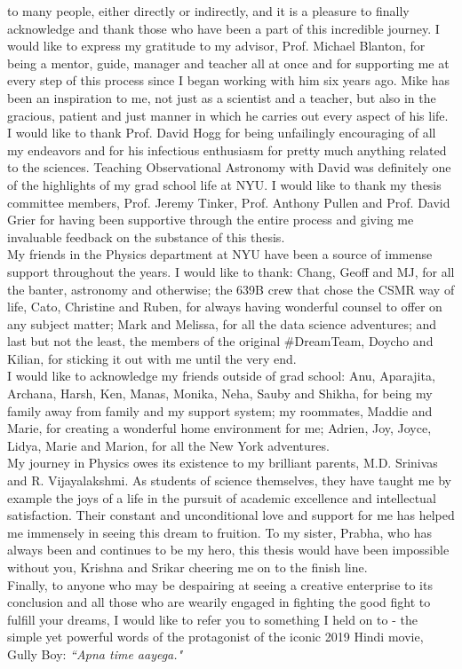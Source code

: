 
 to many people, either directly or indirectly, and it is a pleasure to finally acknowledge and thank those who have been a part of this incredible journey. I would like to express my gratitude to my advisor, Prof. Michael Blanton, for being a mentor, guide, manager and teacher all at once and for supporting me at every step of this process since I began working with him six years ago. Mike has been an inspiration to me, not just as a scientist and a teacher, but also in the gracious, patient and just manner in which he carries out every aspect of his life. I would like to thank Prof. David Hogg for being unfailingly encouraging of all my endeavors and for his infectious enthusiasm for pretty much anything related to the sciences. Teaching Observational Astronomy with David was definitely one of the highlights of my grad school life at NYU. I would like to thank my thesis committee members, Prof. Jeremy Tinker, Prof. Anthony Pullen and Prof. David Grier for having been supportive through the entire process and giving me invaluable feedback on the substance of this thesis.\\

My friends in the Physics department at NYU have been a source of immense support throughout the years. I would like to thank: Chang, Geoff and MJ, for all the banter, astronomy and otherwise; the 639B crew that chose the CSMR way of life, Cato, Christine and Ruben, for always having wonderful counsel to offer on any subject matter; Mark and Melissa, for all the data science adventures; and last but not the least, the members of the original \#DreamTeam, Doycho and Kilian, for sticking it out with me until the very end.\\

I would like to acknowledge my friends outside of grad school: Anu, Aparajita, Archana, Harsh, Ken, Manas, Monika, Neha, Sauby and Shikha, for being my family away from family and my support system; my roommates, Maddie and Marie, for creating a wonderful home environment for me; Adrien, Joy, Joyce, Lidya, Marie and Marion, for all the New York adventures.\\

My journey in Physics owes its existence to my brilliant parents, M.D. Srinivas and R. Vijayalakshmi. As students of science themselves, they have taught me by example the joys of a life in the pursuit of academic excellence and intellectual satisfaction. Their constant and unconditional love and support for me has helped me immensely in seeing this dream to fruition. To my sister, Prabha, who has always been and continues to be my hero, this thesis would have been impossible without you, Krishna and Srikar cheering me on to the finish line.\\

Finally, to anyone who may be despairing at seeing a creative enterprise to its conclusion and all those who are wearily engaged in fighting the good fight to fulfill your dreams, I would like to refer you to something I held on to - the simple yet powerful words of the protagonist of the iconic 2019 Hindi movie, Gully Boy: \emph{``Apna time aayega."}\\
